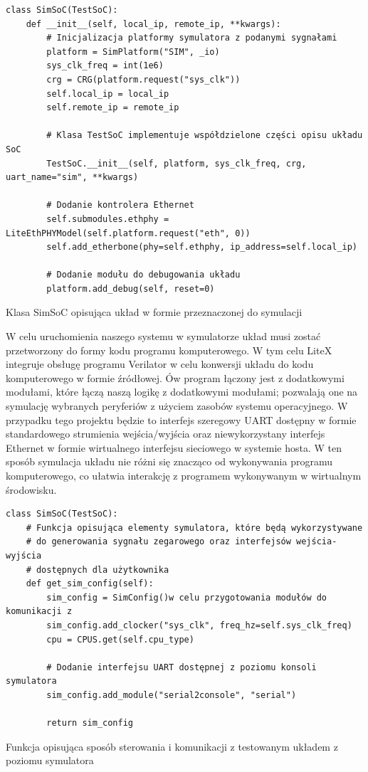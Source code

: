 \begin{listing}[H]
\begin{verbatim}
class SimSoC(TestSoC):
    def __init__(self, local_ip, remote_ip, **kwargs):
        # Inicjalizacja platformy symulatora z podanymi sygnałami
        platform = SimPlatform("SIM", _io)
        sys_clk_freq = int(1e6)
        crg = CRG(platform.request("sys_clk"))
        self.local_ip = local_ip
        self.remote_ip = remote_ip

        # Klasa TestSoC implementuje współdzielone części opisu układu SoC
        TestSoC.__init__(self, platform, sys_clk_freq, crg, uart_name="sim", **kwargs)

        # Dodanie kontrolera Ethernet
        self.submodules.ethphy = LiteEthPHYModel(self.platform.request("eth", 0))
        self.add_etherbone(phy=self.ethphy, ip_address=self.local_ip)

        # Dodanie modułu do debugowania układu
        platform.add_debug(self, reset=0)
\end{verbatim}
\caption{\label{lst:tooling-litex-sim-soc}Klasa SimSoC opisująca układ w formie przeznaczonej do symulacji}
\end{listing}

W celu uruchomienia naszego systemu w symulatorze układ musi zostać przetworzony do formy kodu programu komputerowego. W tym celu LiteX integruje obsługę programu Verilator\cite{verilator:2016:Online} w celu konwersji układu do kodu komputerowego w formie źródłowej. Ów program łączony jest z dodatkowymi modułami, które łączą naszą logikę z dodatkowymi modułami; pozwalają one na symulację wybranych peryferiów z użyciem zasobów systemu operacyjnego. W przypadku tego projektu będzie to interfejs szeregowy UART dostępny w formie standardowego strumienia wejścia/wyjścia oraz niewykorzystany interfejs Ethernet w formie wirtualnego interfejsu sieciowego w systemie hosta. W ten sposób symulacja układu nie różni się znacząco od wykonywania programu komputerowego, co ułatwia interakcję z programem wykonywanym w wirtualnym środowisku.

\begin{listing}[H]
\begin{verbatim}
class SimSoC(TestSoC):
    # Funkcja opisująca elementy symulatora, które będą wykorzystywane
    # do generowania sygnału zegarowego oraz interfejsów wejścia-wyjścia
    # dostępnych dla użytkownika
    def get_sim_config(self):
        sim_config = SimConfig()w celu przygotowania modułów do komunikacji z
        sim_config.add_clocker("sys_clk", freq_hz=self.sys_clk_freq)
        cpu = CPUS.get(self.cpu_type)

        # Dodanie interfejsu UART dostępnej z poziomu konsoli symulatora
        sim_config.add_module("serial2console", "serial")

        return sim_config
\end{verbatim}
\caption{\label{lst:tooling-litex-sim-config}Funkcja opisująca sposób sterowania i komunikacji z testowanym układem z poziomu symulatora}
\end{listing}

